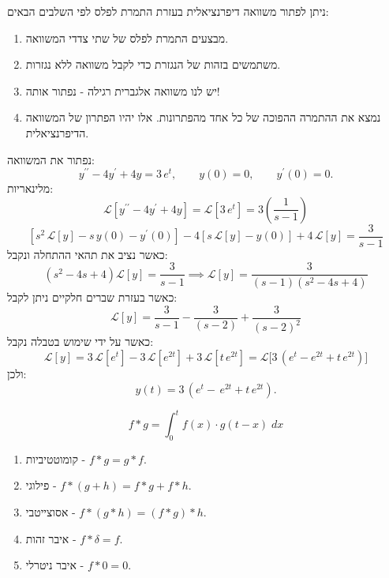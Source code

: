 \documentclass{tstextbook}
\begin{document}
\begin{proposition}
ניתן לפתור משוואה דיפרנציאלית בעזרת התמרת לפלס לפי השלבים הבאים:

  \begin{enumerate}
    \item מבצעים התמרת לפלס של שתי צדדי המשוואה. 


    \item משתמשים בזהות של הנגזרת כדי לקבל משוואה ללא נגזרות. 


    \item יש לנו משוואה אלגברית רגילה - נפתור אותה! 


    \item נמצא את ההתמרה ההפוכה של כל אחד מהפתרונות. אלו יהיו הפתרון של המשוואה הדיפרנציאלית. 


  \end{enumerate}
\end{proposition}
\begin{example}
נפתור את המשוואה:
$$y^{\prime\prime}-4y^{\prime}+4y=3\,e^{t},\qquad y(0)=0,\qquad y^{\prime}(0)=0.$$
מלינאריות:
$${\mathcal{L}}[y^{\prime\prime}-4y^{\prime}+4y]={\mathcal{L}}[3\,e^{t}]=3\left({\frac{1}{s-1}}\right)$$$$\left[s^{2}\,{\mathcal{L}}[y]-s\,y(0)-y^{\prime}(0)\right]-4\left[s\,{\mathcal{L}}[y]-y(0)\right]+4\,{\mathcal{L}}[y]={\frac{3}{s-1}}$$
כאשר נציב את תהאי ההתחלה ונקבל:
$$\left(s^{2}-4s+4\right){\mathcal{L}}[y]={\frac{3}{s-1}}\implies{\mathcal{L}}[y]={\frac{3}{(s-1)(s^{2}-4s+4)}}$$
כאשר בעזרת שברים חלקיים ניתן לקבל:
$${\mathcal{L}}[y]={\frac{3}{s-1}}-{\frac{3}{(s-2)}}+{\frac{3}{(s-2)^{2}}}$$
כאשר על ידי שימוש בטבלה נקבל:
$${\mathcal{L}}[y]=3\,{\mathcal{L}}[e^{t}]-3\,{\mathcal{L}}[e^{2t}]+3\,{\mathcal{L}}[t\,e^{2t}]={\mathcal{L}}\big[3\,(e^{t}-e^{2t}+t\,e^{2t})\big]$$
ולכן:
$$y(t)=3\,(e^{t}-\,e^{2t}+t\,e^{2t}).$$

\end{example}
\begin{definition}[קונבולוציה]
$$f * g = \int_0^t f(x) \cdot g(t-x) \; dx$$

\end{definition}
\begin{proposition}
  \begin{enumerate}
    \item קומוטטיביות - \(f * g = g * f\). 


    \item פילוגי - \(f * (g + h) = f * g + f * h\). 


    \item אסוצייטבי - \(f*(g*h)=(f*g)*h\). 


    \item איבר זהות - \(f * \delta = f\). 


    \item איבר ניטרלי - \(f * 0 = 0\). 


  \end{enumerate}
\end{proposition}
\end{document}

